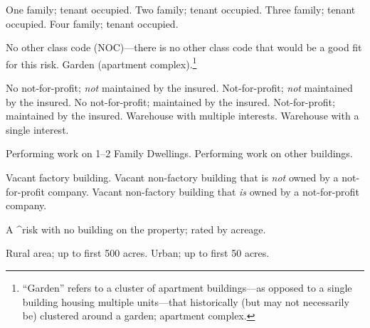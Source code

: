\begin{description}
  \incompletei
    \begin{description}
       One family; tenant occupied.
       Two family; tenant occupied.
       Three family; tenant occupied.
       Four family; tenant occupied.
    \end{description}

  \incompletei
    \begin{description}
       No other class code (NOC)---there is no other class
      code that would be a good fit for this risk.
       Garden (apartment complex).\footnote{``Garden'' refers
      to a cluster of apartment buildings---as opposed to a single building
      housing multiple units---that historically (but may not necessarily be)
      clustered around a garden; apartment complex.%
      }

    \end{description}

  \incompletei
    \begin{description}
       No not-for-profit; \emph{not} maintained by the insured.
       Not-for-profit; \emph{not} maintained by the insured.
       No not-for-profit; maintained by the insured.
       Not-for-profit; maintained by the insured.
       Warehouse with multiple interests.
       Warehouse with a single interest.
    \end{description}

  \incompletei
    \begin{description}
       Performing work on 1--2 Family Dwellings.
       Performing work on other buildings.
    \end{description}

  \incompletei
    \begin{description}
       Vacant factory building.
       Vacant non-factory building that is \emph{not} owned
                         by a not-for-profit company.
       Vacant non-factory building that \emph{is} owned by a
                         not-for-profit company.
    \end{description}

    A ^risk with no building on the property; rated by acreage.
    \begin{description}
       Rural area; up to first 500 acres.
       Urban; up to first 50 acres.
    \end{description}

\end{description}

\enddeptgroup
